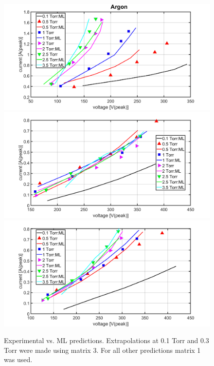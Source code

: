 \documentclass[12pt]{iopart}
\begin{document}
\begin{figure}[ht!]
\begin{center}
    \includegraphics[width=.9\textwidth]{new figures/argon_real_pred.png}
    \includegraphics[width=.9\textwidth]{new figures/n2_real_pred.png}
    \includegraphics[width=.9\textwidth]{new figures/o2_real_pred.png}
\caption{Experimental vs. ML predictions. Extrapolations at 0.1 Torr and 0.3 Torr were made using matrix 3. For all other predictions matrix 1 was used.} 

\label{Fig:gap_SV,pressure_TB,species_TB}
\end{center}
\end{figure}



\end{document}
